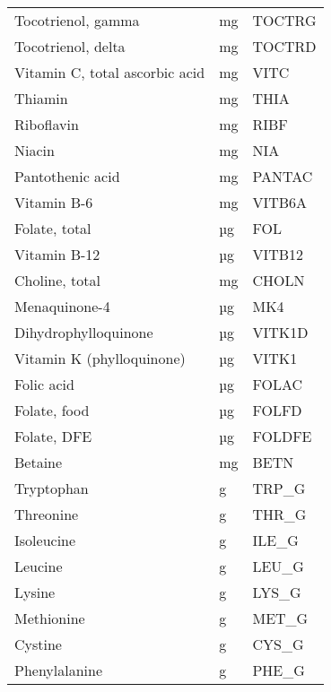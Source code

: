 \documentclass[]{scrartcl}
\begin{document}
\begin{longtable}{lll}
	Tocotrienol, gamma                 &    mg &      TOCTRG \\
	Tocotrienol, delta                 &    mg &      TOCTRD \\
	Vitamin C, total ascorbic acid     &    mg &        VITC \\
	Thiamin                            &    mg &        THIA \\
	Riboflavin                         &    mg &        RIBF \\
	Niacin                             &    mg &         NIA \\
	Pantothenic acid                   &    mg &      PANTAC \\
	Vitamin B-6                        &    mg &      VITB6A \\
	Folate, total                      &    µg &         FOL \\
	Vitamin B-12                       &    µg &      VITB12 \\
	Choline, total                     &    mg &       CHOLN \\
	Menaquinone-4                      &    µg &         MK4 \\
	Dihydrophylloquinone               &    µg &      VITK1D \\
	Vitamin K (phylloquinone)          &    µg &       VITK1 \\
	Folic acid                         &    µg &       FOLAC \\
	Folate, food                       &    µg &       FOLFD \\
	Folate, DFE                        &    µg &      FOLDFE \\
	Betaine                            &    mg &        BETN \\
	Tryptophan                         &     g &       TRP\_G \\
	Threonine                          &     g &       THR\_G \\
	Isoleucine                         &     g &       ILE\_G \\
	Leucine                            &     g &       LEU\_G \\
	Lysine                             &     g &       LYS\_G \\
	Methionine                         &     g &       MET\_G \\
	Cystine                            &     g &       CYS\_G \\
	Phenylalanine                      &     g &       PHE\_G \\

\end{longtable}
\end{document}
